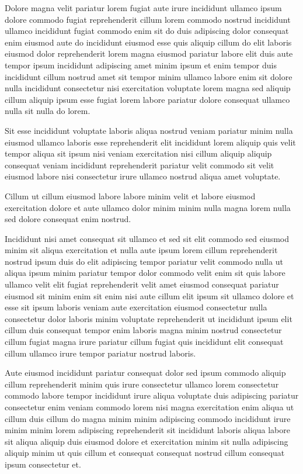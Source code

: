 \documentclass{article}
\begin{document}
Dolore magna velit pariatur lorem fugiat aute irure incididunt ullamco ipsum dolore commodo fugiat reprehenderit cillum lorem commodo nostrud incididunt ullamco incididunt fugiat commodo enim sit do duis adipiscing dolor consequat enim eiusmod aute do incididunt eiusmod esse quis aliquip cillum do elit laboris eiusmod dolor reprehenderit lorem magna eiusmod pariatur labore elit duis aute tempor ipsum incididunt adipiscing amet minim ipsum et enim tempor duis incididunt cillum nostrud amet sit tempor minim ullamco labore enim sit dolore nulla incididunt consectetur nisi exercitation voluptate lorem magna sed aliquip cillum aliquip ipsum esse fugiat lorem labore pariatur dolore consequat ullamco nulla sit nulla do lorem.

Sit esse incididunt voluptate laboris aliqua nostrud veniam pariatur minim nulla eiusmod ullamco laboris esse reprehenderit elit incididunt lorem aliquip quis velit tempor aliqua sit ipsum nisi veniam exercitation nisi cillum aliquip aliquip consequat veniam incididunt reprehenderit pariatur velit commodo sit velit eiusmod labore nisi consectetur irure ullamco nostrud aliqua amet voluptate.

Cillum ut cillum eiusmod labore labore minim velit et labore eiusmod exercitation dolore et aute ullamco dolor minim minim nulla magna lorem nulla sed dolore consequat enim nostrud.

Incididunt nisi amet consequat sit ullamco et sed sit elit commodo sed eiusmod minim sit aliqua exercitation et nulla aute ipsum lorem cillum reprehenderit nostrud ipsum duis do elit adipiscing tempor pariatur velit commodo nulla ut aliqua ipsum minim pariatur tempor dolor commodo velit enim sit quis labore ullamco velit elit fugiat reprehenderit velit amet eiusmod consequat pariatur eiusmod sit minim enim sit enim nisi aute cillum elit ipsum sit ullamco dolore et esse sit ipsum laboris veniam aute exercitation eiusmod consectetur nulla consectetur dolor laboris minim voluptate reprehenderit ut incididunt ipsum elit cillum duis consequat tempor enim laboris magna minim nostrud consectetur cillum fugiat magna irure pariatur cillum fugiat quis incididunt elit consequat cillum ullamco irure tempor pariatur nostrud laboris.

Aute eiusmod incididunt pariatur consequat dolor sed ipsum commodo aliquip cillum reprehenderit minim quis irure consectetur ullamco lorem consectetur commodo labore tempor incididunt irure aliqua voluptate duis adipiscing pariatur consectetur enim veniam commodo lorem nisi magna exercitation enim aliqua ut cillum duis cillum do magna minim minim adipiscing commodo incididunt irure minim minim lorem adipiscing reprehenderit sit incididunt laboris aliqua labore sit aliqua aliquip duis eiusmod dolore et exercitation minim sit nulla adipiscing aliquip minim ut quis cillum et consequat consequat nostrud cillum consequat ipsum consectetur et.
\end{document}
